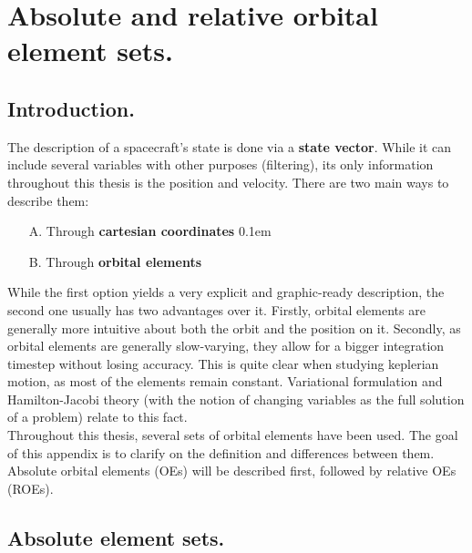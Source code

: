 \chapter{Absolute and relative orbital element sets.}
%
\label{chap:App_A}
%
\section{Introduction.}
%
\indent The description of a spacecraft's state is done via a \textbf{state vector}. While it can include several variables with other purposes (\eg filtering), its only information throughout this thesis is the position and velocity. There are two main ways to describe them:
%
\begin{itemize}
\item[A.] Through \textbf{cartesian coordinates}
\itemsep0.1em 
\item[B.] Through \textbf{orbital elements}
\end{itemize}
%
\indent While the first option yields a very explicit and graphic-ready description, the second one usually has two advantages over it. Firstly, orbital elements are generally more intuitive about both the orbit and the position on it. Secondly, as orbital elements are generally slow-varying, they allow for a bigger integration timestep without losing accuracy. This is quite clear when studying keplerian motion, as most of the elements remain constant. Variational formulation and Hamilton-Jacobi theory (with the notion of changing variables as the full solution of a problem) relate to this fact. \\
%
\indent Throughout this thesis, several sets of orbital elements have been used. The goal of this appendix is to clarify on the definition and differences between them. Absolute orbital elements (OEs) will be described first, followed by relative OEs (ROEs).
%
\section{Absolute element sets.}
%
